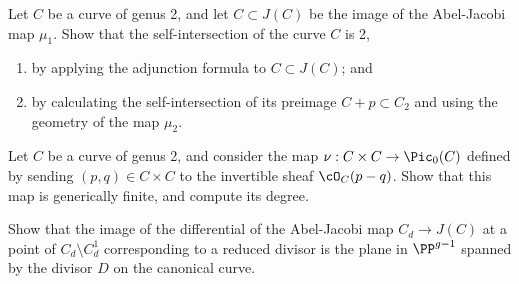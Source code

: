 \begin{exercise}
Let $C$ be a curve of genus 2, and let $C \subset J(C)$ be the image of the Abel-Jacobi map $\mu_1$. Show that the self-intersection of the curve $C$ is 2,
\begin{enumerate}
\item by applying the adjunction formula to $C \subset J(C)$; and
\item by calculating the self-intersection of its preimage $C + p \subset C_2$ and using the geometry of the map $\mu_2$.
\end{enumerate}
\end{exercise}

\begin{exercise}
Let $C$ be a curve of genus 2, and consider the map $\nu : C \times C \to \Pic_0(C)$ defined by sending $(p, q)\in C \times C$ to the invertible sheaf $\cO_C(p-q)$. Show that this map is generically finite, and compute its degree.
\end{exercise}

\begin{exercise} \label{comparison with geometric RR}
Show that the image of the differential of the Abel-Jacobi map $C_{d} \to J(C)$ at a point of $C_{d} \setminus C^1_d$  corresponding to a reduced divisor is  the plane in $\PP^{g-1}$ spanned by the divisor $D$ on the canonical curve.

\end{exercise}


